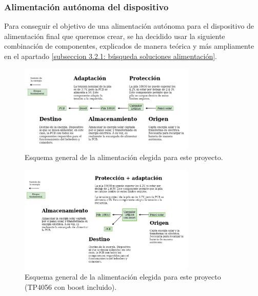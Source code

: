 \documentclass[12pt]{article}
\begin{document}
	\subsubsection{Alimentación autónoma del dispositivo}
	
	\noindent Para conseguir el objetivo de una alimentación autónoma para el dispositivo de alimentación final que queremos crear, se ha decidido usar la siguiente combinación de componentes, explicados de manera teórica y más ampliamente en el apartado \ref{subseccion 3.2.1: búsqueda soluciones alimentación}.
	
	\begin{figure}[h!]
		\begin{center}
			\includegraphics[width=0.75\textwidth]{img/conexiones tfg-alimentacion.png}
			\caption{Esquema general de la alimentación elegida para este proyecto.}
			\label{Alimentación: esquema general}
		\end{center}
	\end{figure}
	
	\begin{figure}[h!]
		\begin{center}
			\includegraphics[width=0.75\textwidth]{img/conexiones tfg-alimentacion (boost en tp).png}
			\caption{Esquema general de la alimentación elegida para este proyecto (TP4056 con boost incluido).}
			\label{Alimentación: esquema general (tp con boost)}
		\end{center}
	\end{figure}
	
\end{document}
